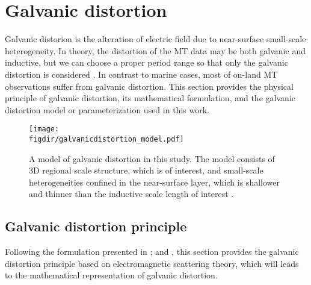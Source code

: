 
\section[Galvanic distortion]{Galvanic distortion}\label{sect:galvanic_distortion}

		 Galvanic distorion is the alteration of electric field due to near-surface small-scale heterogeneity.  
		 In theory, the distortion of the MT data may be both galvanic and inductive, but we can choose a proper period range so that only the galvanic distortion is considered \citep{groom1992a, utada2000a}.
		 In contrast to marine cases, most of on-land MT observations suffer from galvanic distortion. 
		 This section provides the physical principle of galvanic distortion, its mathematical formulation, and the galvanic distortion model or parameterization used in this work.
	
\begin{figure}[!h]
	\centering
	\texttt{[image: \\figdir/galvanicdistortion\_model.pdf]}
	\caption[A model of galvanic distortion in this study]{A model of galvanic distortion in this study. The model consists of 3D regional scale structure, which is of interest, and small-scale heterogeneities confined in the near-surface layer, which is shallower and thinner than the inductive scale length of interest \citep[after][]{utada2000a, rung-arunwan2016a}.}
	\label{fig:galvanic_distortion_model}
\end{figure}

\subsection{Galvanic distortion principle}
		Following the formulation presented in \citet{groom1992a}; \citet{chave1994a} and \citet{utada2000a},
		this section provides the galvanic distortion principle based on electromagnetic scattering theory, which will leads to the mathematical representation of galvanic distortion.
		
